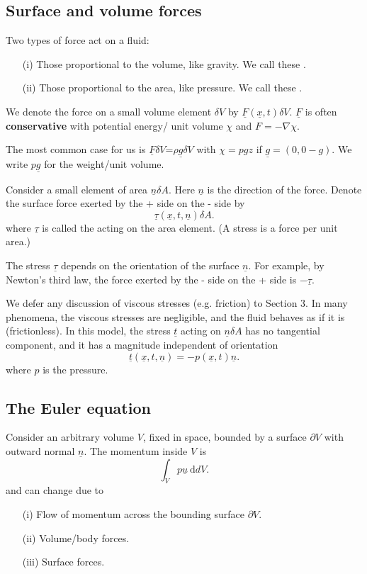 \documentclass[a4paper]{scrartcl}
\renewcommand{\vec}[1]{\underline{#1}}
\begin{document}
\subsection{Surface and volume forces}
Two types of force act on a fluid:
\begin{itemize}
    \item[(i)] Those proportional to the volume, like gravity. We call these .
    \item[(ii)] Those proportional to the area, like pressure. We call these . 
\end{itemize}
\begin{definition*}
     We denote the force on a small volume element $\delta V$ by $\vec{F} (\vec{x},t)\delta V$. $\vec{F}$ is often \textbf{conservative} with potential energy/ unit volume $\chi$ and $F=-\nabla \chi$.

     The most common case for us is $\vec{F} \delta V$=$\rho \vec{g} \delta V$ with $\chi=pgz$ if $\vec{g}=(0,0-g)$. We write $p \vec{g}$ for the weight/unit volume.
\end{definition*}
\begin{definition*}
     Consider a small element of area $\vec{n} \delta A$. Here $\vec{n}$ is the direction of the force. Denote the surface force exerted by the + side on the - side by \[
     \vec{\tau} (\vec{x},t,\vec{n})\delta A
     .\] where $\vec{\tau}$ is called the  acting on the area element. (A stress is a force per unit area.)
\end{definition*}
\begin{remark}
     The stress $\vec{\tau}$ depends on the orientation of the surface $\vec{n}$. For example, by Newton's third law, the force exerted by the - side on the + side is $-\vec{\tau}$.
\end{remark}
We defer any discussion of viscous stresses (e.g. friction) to Section 3. In many phenomena, the viscous stresses are negligible, and the fluid behaves as if it is  (frictionless). In this model, the stress $\vec{t}$ acting on $\vec{n}\delta A$ has no tangential component, and it has a magnitude independent of orientation \[
\vec{t} (\vec{x}, t , \vec{n})=- p (\vec{x},t) \vec{n}
.\] where $p$ is the pressure.
\subsection{The Euler equation}
Consider an arbitrary volume $V$, fixed in space, bounded by a surface $\partial V$ with outward normal $\vec{n}$. The momentum inside $V$ is \[
\int_{V}^{}p \vec{u} \ \mathrm{d}dV 
.\] and can change due to 
\begin{itemize}
    \item[(i)] Flow of momentum across the bounding surface $\partial V$. 
    \item[(ii)] Volume/body forces.
    \item[(iii)] Surface forces.
\end{itemize}
\end{document}
